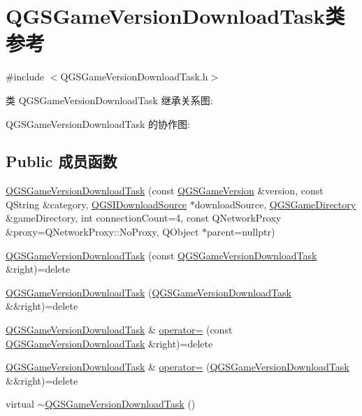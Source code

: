 \hypertarget{class_q_g_s_game_version_download_task}{}\section{Q\+G\+S\+Game\+Version\+Download\+Task类 参考}
\label{class_q_g_s_game_version_download_task}


{\ttfamily \#include $<$Q\+G\+S\+Game\+Version\+Download\+Task.\+h$>$}



类 Q\+G\+S\+Game\+Version\+Download\+Task 继承关系图\+:


Q\+G\+S\+Game\+Version\+Download\+Task 的协作图\+:
\subsection*{Public 成员函数}
\begin{DoxyCompactItemize}
\item 
\mbox{\hyperlink{class_q_g_s_game_version_download_task_ac7dfbfa97e50d31b614e3165e03835da}{Q\+G\+S\+Game\+Version\+Download\+Task}} (const \mbox{\hyperlink{class_q_g_s_game_version}{Q\+G\+S\+Game\+Version}} \&version, const Q\+String \&category, \mbox{\hyperlink{class_q_g_s_i_download_source}{Q\+G\+S\+I\+Download\+Source}} $\ast$download\+Source, \mbox{\hyperlink{class_q_g_s_game_directory}{Q\+G\+S\+Game\+Directory}} \&game\+Directory, int connection\+Count=4, const Q\+Network\+Proxy \&proxy=Q\+Network\+Proxy\+::\+No\+Proxy, Q\+Object $\ast$parent=nullptr)
\item 
\mbox{\hyperlink{class_q_g_s_game_version_download_task_abca6fe42fe9db99d86b06377a14ed553}{Q\+G\+S\+Game\+Version\+Download\+Task}} (const \mbox{\hyperlink{class_q_g_s_game_version_download_task}{Q\+G\+S\+Game\+Version\+Download\+Task}} \&right)=delete
\item 
\mbox{\hyperlink{class_q_g_s_game_version_download_task_a02187f4bfc96bfba302baa387ca60336}{Q\+G\+S\+Game\+Version\+Download\+Task}} (\mbox{\hyperlink{class_q_g_s_game_version_download_task}{Q\+G\+S\+Game\+Version\+Download\+Task}} \&\&right)=delete
\item 
\mbox{\hyperlink{class_q_g_s_game_version_download_task}{Q\+G\+S\+Game\+Version\+Download\+Task}} \& \mbox{\hyperlink{class_q_g_s_game_version_download_task_a9b99a48b95dd4e7d8c8b52e96047626b}{operator=}} (const \mbox{\hyperlink{class_q_g_s_game_version_download_task}{Q\+G\+S\+Game\+Version\+Download\+Task}} \&right)=delete
\item 
\mbox{\hyperlink{class_q_g_s_game_version_download_task}{Q\+G\+S\+Game\+Version\+Download\+Task}} \& \mbox{\hyperlink{class_q_g_s_game_version_download_task_a4e1298632734bee3edb9b3d2b5e2abd9}{operator=}} (\mbox{\hyperlink{class_q_g_s_game_version_download_task}{Q\+G\+S\+Game\+Version\+Download\+Task}} \&\&right)=delete
\item 
virtual \mbox{\hyperlink{class_q_g_s_game_version_download_task_a47feca1bf2c7dbdb7fdc8391b800e502}{$\sim$\+Q\+G\+S\+Game\+Version\+Download\+Task}} ()
\end{DoxyCompactItemize}
